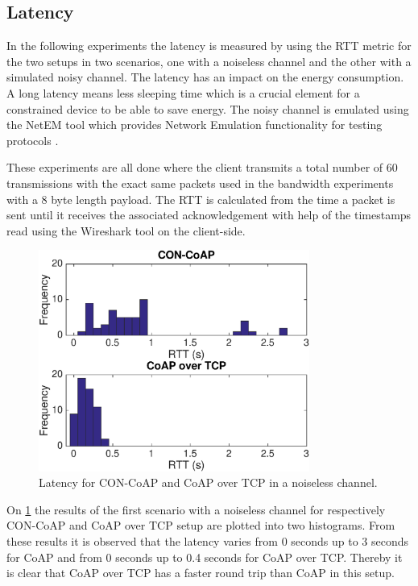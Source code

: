 \subsection{Latency}
In the following experiments the latency is measured by using the RTT metric for the two setups in two scenarios, one with a noiseless channel and the other with a simulated noisy channel. The latency has an impact on the energy consumption. A long latency means less sleeping time which is a crucial element for a constrained device to be able to save energy.
The noisy channel is emulated using the NetEM tool which provides Network Emulation functionality for testing protocols \cite{netem19:online}. 

These experiments are all done where the client transmits a total number of 60 transmissions with the exact same packets used in the bandwidth experiments with a 8 byte length payload. The RTT is calculated from the time a packet is sent until it receives the associated acknowledgement with help of the timestamps read using the Wireshark tool on the client-side.

\begin{figure}[bht]
	\centering
	\includegraphics[width=3.5in]{gfx/latency-clean}
	\caption{Latency for CON-CoAP and CoAP over TCP in a noiseless channel.}
	\label{fig:latencynoiseless}
\end{figure}
On \figurename{\ref{fig:latencynoiseless}} the results of the first scenario with a noiseless channel for respectively CON-CoAP and CoAP over TCP setup are plotted into two histograms. 
From these results it is observed that the latency varies from 0 seconds up to 3 seconds for CoAP and from 0 seconds up to 0.4 seconds for CoAP over TCP. Thereby it is clear that CoAP over TCP has a faster round trip than CoAP in this setup. 

